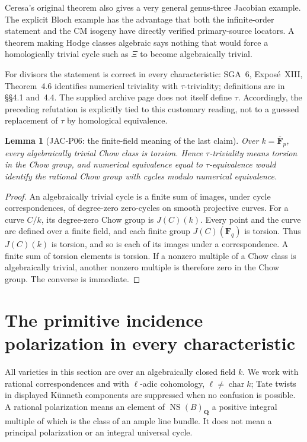 \documentclass[11pt,a4paper]{article}
\newtheorem{lemma}[theorem]{Lemma}
\begin{document}
Ceresa's original theorem also gives a very general genus-three
Jacobian example.  The explicit Bloch example has the advantage that
both the infinite-order statement and the CM isogeny have directly
verified primary-source locators.  A theorem making Hodge classes
algebraic says nothing that would force a homologically trivial
cycle such as $\Xi$ to become algebraically trivial.

For divisors the statement is correct in every characteristic:
SGA~6, Expos\'e~XIII, Theorem~4.6 identifies numerical triviality
with $\tau$-triviality; definitions are in \S\S4.1 and~4.4.
The supplied archive page does not itself define $\tau$.  Accordingly,
the preceding refutation is explicitly tied to this customary reading,
not to a guessed replacement of $\tau$ by homological equivalence.

\begin{lemma}[JAC-P06: the finite-field meaning of the last claim]
\label{jac:P06}
Over $k=\overline{\mathbf F}_p$, every algebraically trivial Chow class
is torsion.  Hence $\tau$-triviality means torsion in the Chow group,
and numerical equivalence equal to $\tau$-equivalence would identify
the rational Chow group with cycles modulo numerical equivalence.
\end{lemma}

\begin{proof}
An algebraically trivial cycle is a finite sum of images, under cycle
correspondences, of degree-zero zero-cycles on smooth projective curves.
For a curve $C/k$, its degree-zero Chow group is $J(C)(k)$.  Every
point and the curve are defined over a finite field, and each finite
group $J(C)(\mathbf F_q)$ is torsion.  Thus $J(C)(k)$ is torsion,
and so is each of its images under a correspondence.  A finite sum of
torsion elements is torsion.  If a nonzero multiple of a Chow class
is algebraically trivial, another nonzero multiple is therefore zero
in the Chow group.  The converse is immediate.
\end{proof}


\section{The primitive incidence polarization in every characteristic}
\label{sec:T4}

All varieties in this section are over an algebraically closed field $k$.
We work with rational correspondences and with $\ell$-adic cohomology,
$\ell\ne\operatorname{char}k$; Tate twists in displayed K\"unneth components
are suppressed when no confusion is possible. A rational polarization means
an element of $\operatorname{NS}(B)_{\mathbf Q}$ a positive integral multiple
of which is the class of an ample line bundle. It does not mean a principal
polarization or an integral universal cycle.
\end{document}

